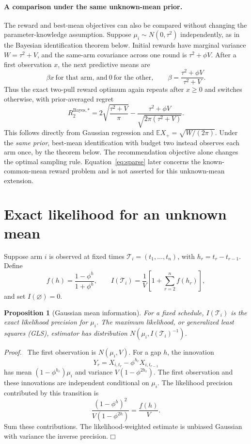 \documentclass[11pt]{article}
\newtheorem{proposition}[theorem]{Proposition}
\newenvironment{proof}{\par\noindent\textit{Proof.}\ }{\hfill$\mdlgwhtsquare$\par\medskip}
\newcommand{\E}{\mathbb E}
\begin{document}
\paragraph{A comparison under the same unknown-mean prior.}
The reward and best-mean objectives can also be compared without changing the parameter-knowledge assumption. Suppose $\mu_i\sim N(0,\tau^2)$ independently, as in the Bayesian identification theorem below. Initial rewards have marginal variance $W=\tau^2+V$, and the same-arm covariance across one round is $\tau^2+\phi V$. After a first observation $x$, the next predictive means are
\[
\beta x\ \text{for that arm, and}\ 0\ \text{for the other},\qquad
\beta=\frac{\tau^2+\phi V}{\tau^2+V}.
\]
Thus the exact two-pull reward optimum again repeats after $x\geq0$ and switches otherwise, with prior-averaged regret
\begin{equation}
\boxed{R_2^{\mathrm{Bayes},*}
=2\sqrt{\frac{\tau^2+V}{\pi}}
-\frac{\tau^2+\phi V}{\sqrt{2\pi(\tau^2+V)}}.}
\label{eq:bayes-regret2}
\end{equation}
This follows directly from Gaussian regression and $\E X_+=\sqrt{W/(2\pi)}$. Under the \emph{same prior}, best-mean identification with budget two instead observes each arm once, by the theorem below. The recommendation objective alone changes the optimal sampling rule. Equation~\eqref{eq:sparse} later concerns the known-common-mean reward problem and is not asserted for this unknown-mean extension.

\section{Exact likelihood for an unknown mean}
Suppose arm $i$ is observed at fixed times $\mathcal T_i=(t_1,\ldots,t_n)$, with $h_r=t_r-t_{r-1}$. Define
\begin{equation}
f(h)=\frac{1-\phi^h}{1+\phi^h},\qquad
I(\mathcal T_i)=\frac1V\left[1+\sum_{r=2}^nf(h_r)\right],
\label{eq:information}
\end{equation}
and set $I(\varnothing)=0$.

\begin{proposition}[Gaussian mean information]
For a fixed schedule, $I(\mathcal T_i)$ is the exact likelihood precision for $\mu_i$. The maximum likelihood, or generalized least squares (GLS), estimator has distribution $N(\mu_i,I(\mathcal T_i)^{-1})$.
\end{proposition}
\begin{proof}
The first observation is $N(\mu_i,V)$. For a gap $h$, the innovation
\[
Y_r=X_{i,t_r}-\phi^{h_r}X_{i,t_{r-1}}
\]
has mean $(1-\phi^{h_r})\mu_i$ and variance $V(1-\phi^{2h_r})$. The first observation and these innovations are independent conditional on $\mu_i$. The likelihood precision contributed by this transition is
\[
\frac{(1-\phi^h)^2}{V(1-\phi^{2h})}=\frac{f(h)}V.
\]
Sum these contributions. The likelihood-weighted estimate is unbiased Gaussian with variance the inverse precision.
\end{proof}
\end{document}
